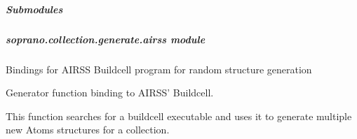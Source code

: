 \documentclass[letterpaper,10pt,english]{sphinxmanual}
\begin{document}
\subparagraph{Submodules}
\label{doctree/soprano.collection.generate:submodules}

\subparagraph{soprano.collection.generate.airss module}
\label{doctree/soprano.collection.generate.airss::doc}\label{doctree/soprano.collection.generate.airss:module-soprano.collection.generate.airss}\label{doctree/soprano.collection.generate.airss:soprano-collection-generate-airss-module}
Bindings for AIRSS Buildcell program for random structure generation

\begin{fulllineitems}
\label{doctree/soprano.collection.generate.airss:soprano.collection.generate.airss.airssGen}
Generator function binding to AIRSS' Buildcell.

This function searches for a buildcell executable and uses it to
generate multiple new Atoms structures for a collection.


\end{fulllineitems}
\end{document}
